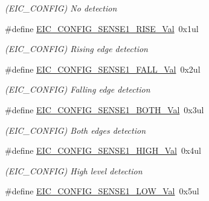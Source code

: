 \begin{DoxyCompactItemize}
\begin{DoxyCompactList}\small\item\em (E\+I\+C\+\_\+\+C\+O\+N\+F\+I\+G) No detection \end{DoxyCompactList}\item 
\hypertarget{group___s_a_m_l21___e_i_c_ga390eb7bfde2edc0c8f7c2aecc55f2f11}{}\#define \hyperlink{group___s_a_m_l21___e_i_c_ga390eb7bfde2edc0c8f7c2aecc55f2f11}{E\+I\+C\+\_\+\+C\+O\+N\+F\+I\+G\+\_\+\+S\+E\+N\+S\+E1\+\_\+\+R\+I\+S\+E\+\_\+\+Val}~0x1ul\label{group___s_a_m_l21___e_i_c_ga390eb7bfde2edc0c8f7c2aecc55f2f11}

\begin{DoxyCompactList}\small\item\em (E\+I\+C\+\_\+\+C\+O\+N\+F\+I\+G) Rising edge detection \end{DoxyCompactList}\item 
\hypertarget{group___s_a_m_l21___e_i_c_ga0ca6a376817490cb3ef82906ffe21923}{}\#define \hyperlink{group___s_a_m_l21___e_i_c_ga0ca6a376817490cb3ef82906ffe21923}{E\+I\+C\+\_\+\+C\+O\+N\+F\+I\+G\+\_\+\+S\+E\+N\+S\+E1\+\_\+\+F\+A\+L\+L\+\_\+\+Val}~0x2ul\label{group___s_a_m_l21___e_i_c_ga0ca6a376817490cb3ef82906ffe21923}

\begin{DoxyCompactList}\small\item\em (E\+I\+C\+\_\+\+C\+O\+N\+F\+I\+G) Falling edge detection \end{DoxyCompactList}\item 
\hypertarget{group___s_a_m_l21___e_i_c_gabb0c4499b66df5612c61697749c38f6f}{}\#define \hyperlink{group___s_a_m_l21___e_i_c_gabb0c4499b66df5612c61697749c38f6f}{E\+I\+C\+\_\+\+C\+O\+N\+F\+I\+G\+\_\+\+S\+E\+N\+S\+E1\+\_\+\+B\+O\+T\+H\+\_\+\+Val}~0x3ul\label{group___s_a_m_l21___e_i_c_gabb0c4499b66df5612c61697749c38f6f}

\begin{DoxyCompactList}\small\item\em (E\+I\+C\+\_\+\+C\+O\+N\+F\+I\+G) Both edges detection \end{DoxyCompactList}\item 
\hypertarget{group___s_a_m_l21___e_i_c_gad9d6fe0929c266f663d7fb7b05296098}{}\#define \hyperlink{group___s_a_m_l21___e_i_c_gad9d6fe0929c266f663d7fb7b05296098}{E\+I\+C\+\_\+\+C\+O\+N\+F\+I\+G\+\_\+\+S\+E\+N\+S\+E1\+\_\+\+H\+I\+G\+H\+\_\+\+Val}~0x4ul\label{group___s_a_m_l21___e_i_c_gad9d6fe0929c266f663d7fb7b05296098}

\begin{DoxyCompactList}\small\item\em (E\+I\+C\+\_\+\+C\+O\+N\+F\+I\+G) High level detection \end{DoxyCompactList}\item 
\hypertarget{group___s_a_m_l21___e_i_c_gaece415d353240e8ee175072f6a5224cd}{}\#define \hyperlink{group___s_a_m_l21___e_i_c_gaece415d353240e8ee175072f6a5224cd}{E\+I\+C\+\_\+\+C\+O\+N\+F\+I\+G\+\_\+\+S\+E\+N\+S\+E1\+\_\+\+L\+O\+W\+\_\+\+Val}~0x5ul\label{group___s_a_m_l21___e_i_c_gaece415d353240e8ee175072f6a5224cd}


\end{DoxyCompactItemize}
